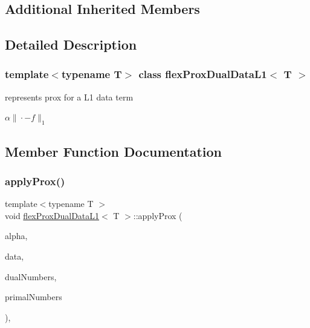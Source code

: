 \subsection*{Additional Inherited Members}


\subsection{Detailed Description}
\subsubsection*{template$<$typename T$>$\newline
class flex\+Prox\+Dual\+Data\+L1$<$ T $>$}

represents prox for a L1 data term 

$ \alpha\|\cdot-f\|_1 $ 

\subsection{Member Function Documentation}
\mbox{\label{classflex_prox_dual_data_l1_a8ebb08fae14a70bc6ed15b6d75b67705}} 
\subsubsection{\texorpdfstring{apply\+Prox()}{applyProx()}\hspace{0.1cm}{\footnotesize\ttfamily [1/2]}}
{\footnotesize\ttfamily template$<$typename T $>$ \\
void \hyperlink{classflex_prox_dual_data_l1}{flex\+Prox\+Dual\+Data\+L1}$<$ T $>$\+::apply\+Prox (\begin{DoxyParamCaption}\item[{T}]{alpha,  }\item[{\hyperlink{classflex_box_data}{flex\+Box\+Data}$<$ T $>$ $\ast$}]{data,  }\item[{const std\+::vector$<$ int $>$ \&}]{dual\+Numbers,  }\item[{const std\+::vector$<$ int $>$ \&}]{primal\+Numbers }\end{DoxyParamCaption})\hspace{0.3cm}{\ttfamily [inline]}, {\ttfamily [virtual]}}




